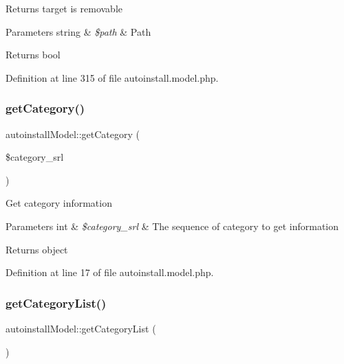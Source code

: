 Returns target is removable


\begin{DoxyParams}[1]{Parameters}
string & {\em \$path} & Path \\
\hline
\end{DoxyParams}
\begin{DoxyReturn}{Returns}
bool 
\end{DoxyReturn}


Definition at line 315 of file autoinstall.\+model.\+php.

\mbox{\label{classautoinstallModel_a8f87ae860d59c5230baded7e25f38b96}} 
\subsubsection{\texorpdfstring{get\+Category()}{getCategory()}}
{\footnotesize\ttfamily autoinstall\+Model\+::get\+Category (\begin{DoxyParamCaption}\item[{}]{\$category\+\_\+srl }\end{DoxyParamCaption})}

Get category information


\begin{DoxyParams}[1]{Parameters}
int & {\em \$category\+\_\+srl} & The sequence of category to get information \\
\hline
\end{DoxyParams}
\begin{DoxyReturn}{Returns}
object 
\end{DoxyReturn}


Definition at line 17 of file autoinstall.\+model.\+php.

\mbox{\label{classautoinstallModel_a64deb99bf9367124115928a6faa12933}} 
\subsubsection{\texorpdfstring{get\+Category\+List()}{getCategoryList()}}
{\footnotesize\ttfamily autoinstall\+Model\+::get\+Category\+List (\begin{DoxyParamCaption}{ }\end{DoxyParamCaption})}

